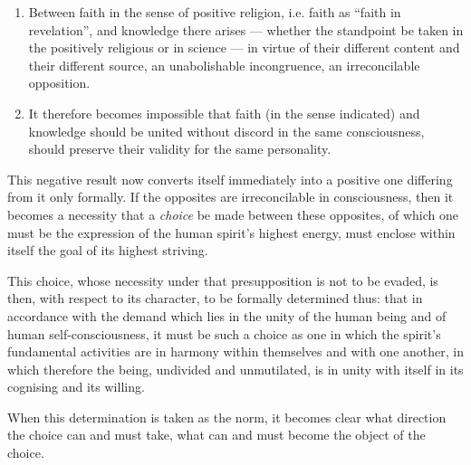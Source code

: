 \documentclass[12pt,a4paper]{book}
\begin{document}
\begin{enumerate}[label=\arabic*., leftmargin=*, labelsep=1em,
                  topsep=0.35\baselineskip, itemsep=0.35\baselineskip]
\item Between faith in the sense of positive religion, i.e. faith as ``faith
  in revelation'', and knowledge there arises --- whether the standpoint be
  taken in the positively religious or in science --- in virtue of their
  different content and their different source, an unabolishable incongruence,
  an irreconcilable opposition.
\item It therefore becomes impossible that faith (in the sense indicated) and
  knowledge should be united without discord in the same consciousness, should
  preserve their validity for the same personality.
\end{enumerate}

This negative result now converts itself immediately into a positive one
differing from it only formally. If the opposites are irreconcilable in
consciousness, then it becomes a necessity that a \emph{choice} be made
between these opposites, of which one must be the expression of the human
spirit's highest energy, must enclose within itself the goal of its highest
striving.

This choice, whose necessity under that presupposition is not to be evaded, is
then, with respect to its character, to be formally determined thus: that in
accordance with the demand which lies in the unity of the human being and of
human self-consciousness, it must be such a choice as one in which the
spirit's fundamental activities are in harmony within themselves and with one
another, in which therefore the being, undivided and unmutilated, is in unity
with itself in its cognising and its willing.

When this determination is taken as the norm, it becomes clear what direction
the choice can and must take, what can and must become the object of the
choice.
\end{document}
